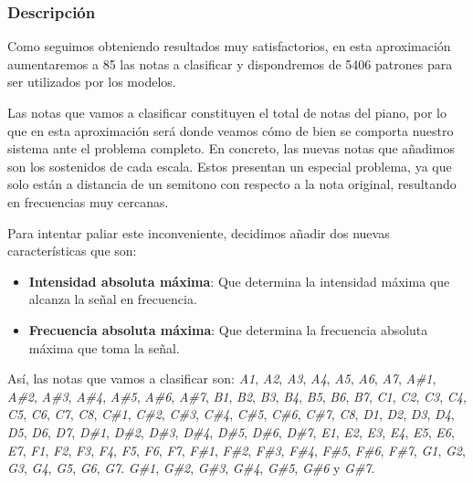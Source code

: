 \documentclass[12pt]{article}
\begin{document}
\subsubsection{Descripción}
Como seguimos obteniendo resultados muy satisfactorios, en esta aproximación aumentaremos a 85 las notas a clasificar y dispondremos de 
5406 patrones para ser utilizados por los modelos. 

\bigskip
Las notas que vamos a clasificar constituyen el total de notas del
piano, por lo que en esta aproximación será donde veamos cómo de bien se comporta nuestro sistema ante el problema
completo.
En concreto, las nuevas notas que añadimos son los sostenidos de cada escala. Estos presentan un especial problema, ya que solo están a distancia de un semitono con
respecto a la nota original, resultando en frecuencias muy cercanas.

\bigskip
Para intentar paliar este inconveniente, decidimos añadir dos nuevas características que son:
\begin{itemize}
	\item \textbf{Intensidad absoluta máxima}: Que determina la intensidad máxima que alcanza la señal en frecuencia.
	\item \textbf{Frecuencia absoluta máxima}: Que determina la frecuencia absoluta máxima que toma la señal.
\end{itemize}

\bigskip
Así, las notas que vamos a clasificar son: 
\textit{A1}, \textit{A2}, \textit{A3}, \textit{A4}, \textit{A5}, \textit{A6}, \textit{A7},
\textit{A\#1}, \textit{A\#2}, \textit{A\#3}, \textit{A\#4}, \textit{A\#5}, \textit{A\#6}, \textit{A\#7},
\textit{B1}, \textit{B2}, \textit{B3}, \textit{B4}, \textit{B5}, \textit{B6}, \textit{B7},
\textit{C1}, \textit{C2}, \textit{C3}, \textit{C4}, \textit{C5}, \textit{C6}, \textit{C7}, \textit{C8},
\textit{C\#1}, \textit{C\#2}, \textit{C\#3}, \textit{C\#4}, \textit{C\#5}, \textit{C\#6}, \textit{C\#7}, \textit{C8}, 
\textit{D1}, \textit{D2}, \textit{D3}, \textit{D4}, \textit{D5}, \textit{D6}, \textit{D7},
\textit{D\#1}, \textit{D\#2}, \textit{D\#3}, \textit{D\#4}, \textit{D\#5}, \textit{D\#6}, \textit{D\#7},
\textit{E1}, \textit{E2}, \textit{E3}, \textit{E4}, \textit{E5}, \textit{E6}, \textit{E7},
\textit{F1}, \textit{F2}, \textit{F3}, \textit{F4}, \textit{F5}, \textit{F6}, \textit{F7},
\textit{F\#1}, \textit{F\#2}, \textit{F\#3}, \textit{F\#4}, \textit{F\#5}, \textit{F\#6}, \textit{F\#7},
\textit{G1}, \textit{G2}, \textit{G3}, \textit{G4}, \textit{G5}, \textit{G6}, \textit{G7}.
\textit{G\#1}, \textit{G\#2}, \textit{G\#3}, \textit{G\#4}, \textit{G\#5}, \textit{G\#6} y \textit{G\#7}.
\end{document}
